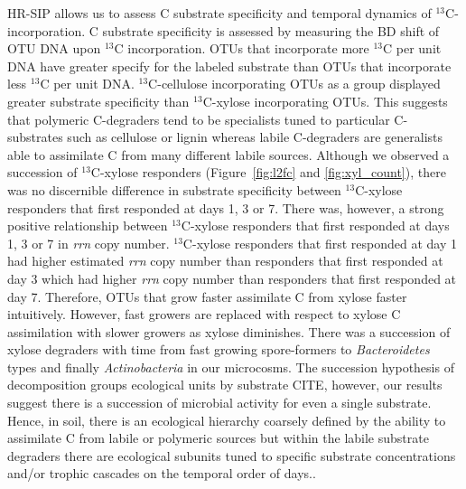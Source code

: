 HR-SIP allows us to assess C substrate specificity and temporal dynamics of
$^{13}$C-incorporation. C substrate specificity is assessed by measuring the 
BD shift of OTU DNA upon $^{13}$C incorporation. OTUs that incorporate more
$^{13}$C per unit DNA have greater specify for the labeled substrate than
OTUs that incorporate less $^{13}$C per unit DNA. $^{13}$C-cellulose 
incorporating OTUs as a group displayed greater substrate specificity than
$^{13}$C-xylose incorporating OTUs. This suggests that polymeric C-degraders
tend to be specialists tuned to particular C-substrates such as cellulose
or lignin whereas labile C-degraders are generalists able to assimilate
C from many different labile sources. Although we observed a succession of 
$^{13}$C-xylose responders (Figure~\ref{fig:l2fc} and \ref{fig:xyl_count}), 
there was no discernible difference in substrate specificity between 
$^{13}$C-xylose responders that first responded at days 1, 3 or 7. There was,
however, a strong positive relationship between $^{13}$C-xylose responders that
first responded at days 1, 3 or 7 in \textit{rrn} copy number. $^{13}$C-xylose 
responders that first responded at day 1 had higher estimated \textit{rrn} copy 
number than responders that first responded at day 3 which had higher
\textit{rrn} copy number than responders that first responded at day 7.
Therefore, OTUs that grow faster assimilate C from xylose faster intuitively.
However, fast growers are replaced with respect to xylose C assimilation with
slower growers as xylose diminishes. There was a succession of xylose degraders
with time from fast growing spore-formers to \textit{Bacteroidetes} types and
finally \textit{Actinobacteria} in our microcosms. The succession hypothesis of
decomposition groups ecological units by substrate CITE, however, our results
suggest there is a succession of microbial activity for even a single
substrate. Hence, in soil, there is an ecological hierarchy coarsely defined by
the ability to assimilate C from labile or polymeric sources but within the
labile substrate degraders there are ecological subunits tuned to specific
substrate concentrations and/or trophic cascades on the temporal order of days..

